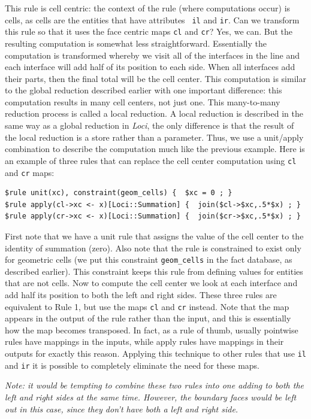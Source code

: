 \documentclass[10pt,epsf,letterpaper,twoside]{book}
\begin{document}
This rule is cell centric: the context of the rule (where computations
occur) is cells, as cells are the entities that have attributes {\tt
  il} and {\tt ir}.  Can we transform this rule so that it uses the
face centric maps {\tt cl} and {\tt cr}?  Yes, we can.  But the
resulting computation is somewhat less straightforward.  Essentially
the computation is transformed whereby we visit all of the interfaces
in the line and each interface will add half of its position to each
side.  When all interfaces add their parts, then the final total will
be the cell center.  This computation is similar to the global
reduction described earlier with one important difference: this
computation results in many cell centers, not just one.  This
many-to-many reduction process is called a local reduction.  A local
reduction is described in the same way as a global reduction in {\it Loci},
the only difference is that the result of the local reduction is a
store rather than a parameter.  Thus, we use a unit/apply combination
to describe the computation much like the previous example.  Here is
an example of three rules that can replace the cell center computation
using {\tt cl} and {\tt cr} maps:
\begin{verbatim}
$rule unit(xc), constraint(geom_cells) {  $xc = 0 ; }
$rule apply(cl->xc <- x)[Loci::Summation] {  join($cl->$xc,.5*$x) ; }
$rule apply(cr->xc <- x)[Loci::Summation] {  join($cr->$xc,.5*$x) ; }
\end{verbatim}
First note that we have a unit rule that assigns the value of the cell
center to the identity of summation (zero).  Also note that the rule
is constrained to exist only for geometric cells (we put this
constraint {\tt geom\_cells} in the fact database, as described
earlier).  This constraint keeps this rule from defining values for
entities that are not cells.  Now to compute the cell center we look
at each interface and add half its position to both the left and right
sides.  These three rules are equivalent to Rule 1, but use the maps
{\tt cl} and {\tt cr} instead.  Note that the map appears in the
output of the rule rather than the input, and this is essentially how
the map becomes transposed.  In fact, as a rule of thumb, usually
pointwise rules have mappings in the inputs, while apply rules have
mappings in their outputs for exactly this reason.  Applying this
technique to other rules that use {\tt il} and {\tt ir} it is possible
to completely eliminate the need for these maps.

{\it Note: it would be tempting to combine these two rules
into one adding to both the left and right sides at the same time.
However, the boundary faces would be left out in this case, since they
don't have both a left and right side.}
\end{document}
